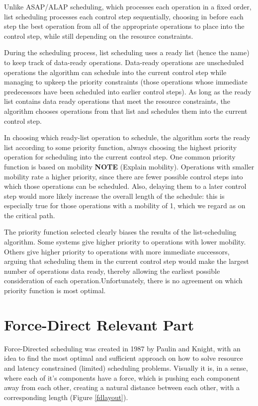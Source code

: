 \documentclass[conference]{IEEEtran}
\begin{document}
Unlike ASAP/ALAP scheduling, which processes each operation in a fixed order, list scheduling processes each control step sequentially, choosing in before each step the best operation from all of the appropriate operations to place into the control step, while still depending on the resource constraints.

During the scheduling process, list scheduling uses a ready list (hence the name) to keep track of data-ready operations. Data-ready operations are unscheduled operations the algorithm can
schedule into the current control step while managing to upkeep the priority constraints (those operations whose immediate predecessors have been scheduled into earlier control steps). As
long as the ready list contains data ready operations that meet the resource constraints, the algorithm chooses operations from that list and schedules them into the current control step. 

In choosing which ready-list operation to schedule, the algorithm sorts the ready list according to some priority function, always choosing the highest priority operation for scheduling into
the current control step. One common priority function is based on mobility \textbf{NOTE} (Explain mobility). Operations with smaller mobility rate a higher priority, since there are fewer possible control steps into which those operations can be scheduled. Also, delaying them to a later control step would more likely increase the overall length of the schedule: this is especially true for those operations with a mobility of 1, which we regard as on the critical path.

The priority function selected clearly biases the results of the list-scheduling algorithm. Some systems give higher priority to operations with lower mobility. Others give higher priority to operations with more immediate successors, arguing that scheduling
them in the current control step would make the largest number of operations
data ready, thereby allowing the earliest possible consideration of each operation.Unfortunately, there is no agreement on which priority function is most optimal.

\section{Force-Direct Relevant Part}
Force-Directed scheduling was created in 1987 by Paulin and Knight, with an idea to find the most optimal and sufficient approach on how to solve resource and latency constrained (limited) scheduling problems. Visually it is, in a sense, where each of it's components have a force, which is pushing each component away from each other, creating a natural distance between each other, with a corresponding length (Figure \ref{fdlayout}).
\end{document}
